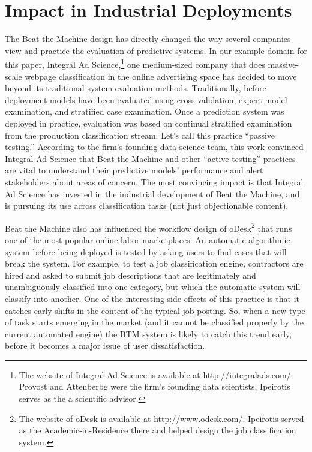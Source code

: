 \section{Impact in Industrial Deployments}
\label{sec:impact}

The Beat the Machine design has directly changed the way several companies view and practice the evaluation of predictive systems.  In our example domain for this paper, Integral Ad Science,\footnote{The website of Integral Ad Science is available at \url{http://integralads.com/}. Provost and Attenberbg were the firm's founding data scientists, Ipeirotis serves as the a scientific advisor.} one medium-sized company that does massive-scale webpage classification in the online advertising space has decided to move beyond its traditional system evaluation methods.  Traditionally, before deployment models have been evaluated using cross-validation, expert model examination, and stratified case examination.  Once a prediction system was deployed in practice, evaluation was based on continual stratified examination from the production classification stream.  Let's call this practice ``passive testing.'' 
According to the firm's founding data science team, this work convinced Integral Ad Science that Beat the Machine and other ``active testing'' practices are vital to understand their predictive models' performance and alert stakeholders about areas of concern.  The most convincing impact is that Integral Ad Science has invested in the industrial development of Beat the Machine, and is pursuing its use across classification tasks (not just objectionable content). 

Beat the Machine also has influenced the workflow design of oDesk\footnote{The website of oDesk is available at \url{http://www.odesk.com/}. Ipeirotis served as the Academic-in-Residence there and helped design the job classification system.} that runs one of the most popular online labor marketplaces: An automatic algorithmic system before being deployed is tested by asking users to find cases that will break the system. For example, to test a job classification engine, contractors are hired and asked to submit job descriptions that are legitimately and unambiguously classified into one category, but which the automatic system will classify into another. One of the interesting side-effects of this practice is that it catches early shifts in the content of the typical job posting.  So, when a new type of task starts emerging in the market (and it cannot be classified properly by the current automated engine) the BTM system is likely to catch this trend early, before it becomes a major issue of user dissatisfaction.

